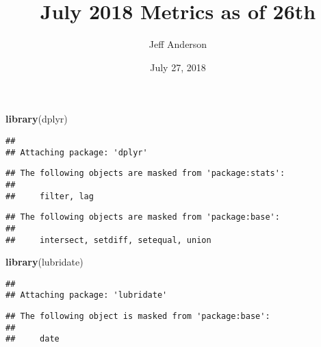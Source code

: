 \documentclass[]{article}
\title{July 2018 Metrics as of 26th}
\author{Jeff Anderson}
\date{July 27, 2018}
\newenvironment{Shaded}{\begin{snugshade}}{\end{snugshade}}
\newcommand{\KeywordTok}[1]{\textcolor[rgb]{0.13,0.29,0.53}{\textbf{#1}}}
\newcommand{\NormalTok}[1]{#1}
\begin{document}
\maketitle

\begin{Shaded}
\begin{Highlighting}[]
\KeywordTok{library}\NormalTok{(dplyr)}
\end{Highlighting}
\end{Shaded}

\begin{verbatim}
## 
## Attaching package: 'dplyr'
\end{verbatim}

\begin{verbatim}
## The following objects are masked from 'package:stats':
## 
##     filter, lag
\end{verbatim}

\begin{verbatim}
## The following objects are masked from 'package:base':
## 
##     intersect, setdiff, setequal, union
\end{verbatim}

\begin{Shaded}
\begin{Highlighting}[]
\KeywordTok{library}\NormalTok{(lubridate)}
\end{Highlighting}
\end{Shaded}

\begin{verbatim}
## 
## Attaching package: 'lubridate'
\end{verbatim}

\begin{verbatim}
## The following object is masked from 'package:base':
## 
##     date
\end{verbatim}
\end{document}
